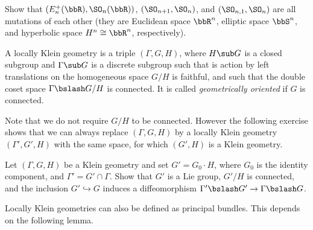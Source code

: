 \begin{xca}
    Show that $(E_n^+(\bbR),\SO_n(\bbR))$, $(\SO_{n+1},\SO_n)$, and $(\SO_{n,1},\SO_n)$ are all mutations of each other (they are Euclidean space $\bbR^n$, elliptic space $\bbS^n$, and hyperbolic space $H^n\cong\bbR^n$, respectively).
\end{xca}


\begin{defn}
    A locally Klein geometry is a triple $(\Gamma,G,H)$, where $H\sub G$ is a closed subgroup and $\Gamma\sub G$ is a discrete subgroup such that is action by left translations on the homogeneous space $G\slash H$ is faithful, and such that the double coset space $\Gamma\bslash G\slash H$ is connected.  It is called \emph{geometrically oriented} if $G$ is connected.
\end{defn}

Note that we do not require $G\slash H$ to be connected. However the following exercise shows that we can always replace $(\Gamma,G,H)$ by a locally Klein geometry $(\Gamma',G',H)$ with the same space, for which $(G',H)$ is a Klein geometry.

\begin{xca}
    Let $(\Gamma,G,H)$ be a Klein geometry and set $G'=G_0\cdot H$, where $G_0$ is the identity component, and $\Gamma'=G'\cap \Gamma$. Show that $G'$ is a Lie group, $G'\slash H$ is connected, and the inclusion $G'\hookrightarrow G$ induces a diffeomorphism $\Gamma'\bslash G'\to \Gamma\bslash G$.
\end{xca}

Locally Klein geometries can also be defined as principal bundles. This depends on the following lemma.

